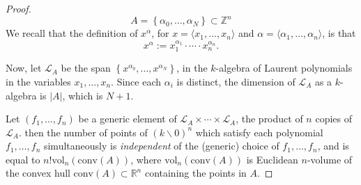 \documentclass[12pt]{article}
\newcommand{\Z}{\mathbb{Z}}
\newcommand{\R}{\mathbb{R}}
\theoremstyle{definition}
\newenvironment{problem}[2][Problem]{\begin{trivlist}
\item[\hskip \labelsep {\bfseries #1}\hskip \labelsep {\bfseries #2.}]}{\end{trivlist}}
\begin{document}
\begin{problem}{1}
\begin{enumerate}[label=(\alph*)]
\begin{proof}
			\[A = \left\{ \alpha_0, \dots , \alpha_N \right\} \subset \Z^n\]
			We recall that the definition of $x^\alpha$, for $x = \langle x_1, \dots , x_n\rangle$ and $ \alpha = \langle \alpha_1, \dots , \alpha_n\rangle$, is that
			\[x^\alpha := x_1^{\alpha_1} \cdot \cdots \cdot x_n^{\alpha_n}.\]
			\par Now, let $\mathcal L_A$ be the span $\left\{ x^{\alpha_0}, \dots , x^{\alpha_N} \right\}$, in the $k$-algebra of Laurent polynomials in the variables $x_1, \dots , x_n$. Since each $\alpha_i$ is distinct, the dimension of $\mathcal{L}_A$ as a $k$-algebra is $\left \lvert { A } \right \lvert $, which is $N + 1$.
			\par Let $(f_1, \dots , f_n)$ be a generic element of $\mathcal{L}_A \times \cdots \times \mathcal{L}_A$, the product of $n$ copies of $\mathcal{L}_A$. then the number of points of $(k \backslash 0)^n$ which satisfy each polynomial $f_1, \dots , f_n$ simultaneously is \textit{independent} of the (generic) choice of $f_1, \dots , f_n$, and is equal to $n! \text{vol}_n(\text{conv}(A))$, where $\text{vol}_n(\text{conv}(A))$ is Euclidean $n$-volume of the convex hull $\text{conv}(A) \subset \R^n$ containing the points in $A$.
		\end{proof}
\end{enumerate}
\end{problem}
\end{document}

